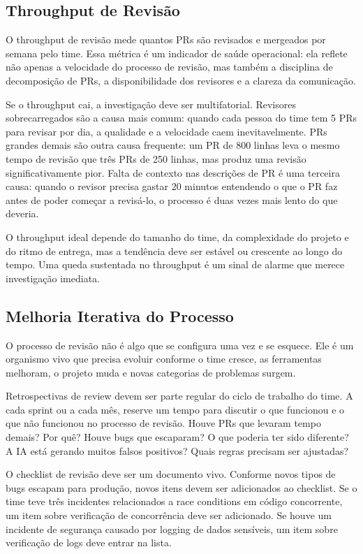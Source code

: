 \subsection{Throughput de Revisão}

O throughput de revisão mede quantos PRs são revisados e mergeados por semana pelo
time. Essa métrica é um indicador de saúde operacional: ela reflete não apenas a
velocidade do processo de revisão, mas também a disciplina de decomposição de PRs,
a disponibilidade dos revisores e a clareza da comunicação.

Se o throughput cai, a investigação deve ser multifatorial. Revisores sobrecarregados
são a causa mais comum: quando cada pessoa do time tem 5 PRs para revisar por dia,
a qualidade e a velocidade caem inevitavelmente. PRs grandes demais são outra causa
frequente: um PR de 800 linhas leva o mesmo tempo de revisão que três PRs de 250
linhas, mas produz uma revisão significativamente pior. Falta de contexto nas
descrições de PR é uma terceira causa: quando o revisor precisa gastar 20 minutos
entendendo o que o PR faz antes de poder começar a revisá-lo, o processo é duas
vezes mais lento do que deveria.

O throughput ideal depende do tamanho do time, da complexidade do projeto e do
ritmo de entrega, mas a tendência deve ser estável ou crescente ao longo do tempo.
Uma queda sustentada no throughput é um sinal de alarme que merece investigação
imediata.

\subsection{Melhoria Iterativa do Processo}

O processo de revisão não é algo que se configura uma vez e se esquece. Ele é um
organismo vivo que precisa evoluir conforme o time cresce, as ferramentas melhoram,
o projeto muda e novas categorias de problemas surgem.

Retrospectivas de review devem ser parte regular do ciclo de trabalho do time. A cada
sprint ou a cada mês, reserve um tempo para discutir o que funcionou e o que não
funcionou no processo de revisão. Houve PRs que levaram tempo demais? Por quê? Houve
bugs que escaparam? O que poderia ter sido diferente? A IA está gerando muitos falsos
positivos? Quais regras precisam ser ajustadas?

O checklist de revisão deve ser um documento vivo. Conforme novos tipos de bugs
escapam para produção, novos itens devem ser adicionados ao checklist. Se o time
teve três incidentes relacionados a race conditions em código concorrente, um item
sobre verificação de concorrência deve ser adicionado. Se houve um incidente de
segurança causado por logging de dados sensíveis, um item sobre verificação de logs
deve entrar na lista.

